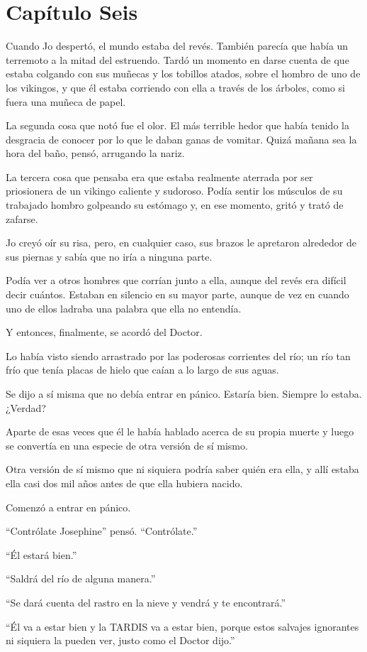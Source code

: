 \chapter*{Capítulo Seis}

Cuando Jo despertó, el mundo estaba del revés. También parecía que había
un terremoto a la mitad del estruendo. Tardó un momento en darse cuenta
de que estaba colgando con sus muñecas y los tobillos atados, sobre el
hombro de uno de los vikingos, y que él estaba corriendo con ella a
través de los árboles, como si fuera una muñeca de papel.

La segunda cosa que notó fue el olor. El más terrible hedor que había
tenido la desgracia de conocer por lo que le daban ganas de vomitar.
Quizá mañana sea la hora del baño, pensó, arrugando la nariz.

La tercera cosa que pensaba era que estaba realmente aterrada por ser
priosionera de un vikingo caliente y sudoroso. Podía sentir los músculos
de su trabajado hombro golpeando su estómago y, en ese momento, gritó y
trató de zafarse.

Jo creyó oír su risa, pero, en cualquier caso, sus brazos le apretaron
alrededor de sus piernas y sabía que no iría a ninguna parte.

Podía ver a otros hombres que corrían junto a ella, aunque del revés era
difícil decir cuántos. Estaban en silencio en su mayor parte, aunque de
vez en cuando uno de ellos ladraba una palabra que ella no entendía.

Y entonces, finalmente, se acordó del Doctor.

Lo había visto siendo arrastrado por las poderosas corrientes del río;
un río tan frío que tenía placas de hielo que caían a lo largo de sus
aguas.

Se dijo a sí misma que no debía entrar en pánico. Estaría bien. Siempre
lo estaba. ¿Verdad?

Aparte de esas veces que él le había hablado acerca de su propia muerte
y luego se convertía en una especie de otra versión de sí mismo.

Otra versión de sí mismo que ni siquiera podría saber quién era ella, y
allí estaba ella casi dos mil años antes de que ella hubiera nacido.

Comenzó a entrar en pánico.

``Contrólate Josephine'' pensó. ``Contrólate.''

``Él estará bien.''

``Saldrá del río de alguna manera.''

``Se dará cuenta del rastro en la nieve y vendrá y te encontrará.''

``Él va a estar bien y la TARDIS va a estar bien, porque estos salvajes
ignorantes ni siquiera la pueden ver, justo como el Doctor dijo.''
